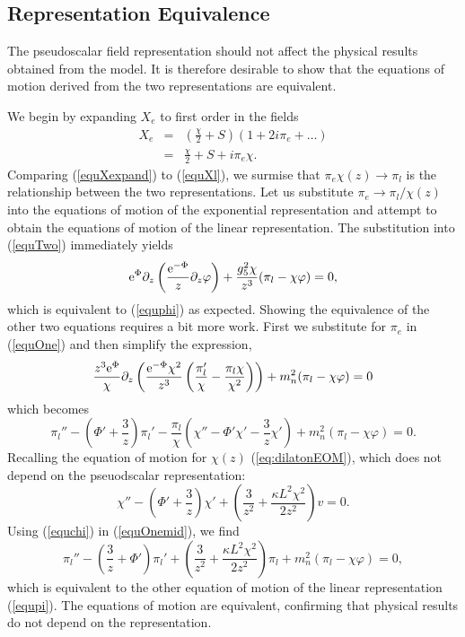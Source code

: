 \subsection{Representation Equivalence}

The pseudoscalar field representation should not affect the physical results obtained from the model. 
It is therefore desirable to show that the equations of motion derived from the two representations are equivalent.

We begin by expanding $X_{e}$ to first order in the fields 
\begin{eqnarray}
X_{e} & = & \left(\frac{\chi}{2}+S\right)(1+2i\pi_{e}+\ldots)\nonumber \\
 & = & \frac{\chi}{2}+S+i\pi_{e}\chi.\label{equXexpand}
\end{eqnarray}
Comparing (\ref{equXexpand}) to (\ref{equXl}), we surmise that $\pi_{e}\chi(z)\rightarrow\pi_{l}$ is the relationship between the two representations. 
Let us substitute
$\pi_{e}\rightarrow\pi_{l}/\chi(z)$ into the equations of motion of the exponential representation and attempt to obtain the equations of motion of the linear representation. 
The substitution into (\ref{equTwo}) immediately yields 
\begin{equation}
{\rm e}^{\Phi}\partial_{z}\left(\frac{{\rm e}^{-\Phi}}{z}\partial_{z}\varphi\right)+\frac{g_{5}^{2}\chi}{z^{3}}(\pi_{l}-\chi\varphi)=0,
\end{equation}
which is equivalent to (\ref{equphi}) as expected. 
Showing the equivalence of the other two equations requires a bit more work. 
First we substitute for $\pi_{e}$ in (\ref{equOne}) and then simplify the expression,
\begin{equation}
\frac{z^{3}{\rm e}^{\Phi}}{\chi}\partial_{z}\left(\frac{{\rm e}^{-\Phi}\chi^{2}}{z^{3}}\left(\frac{\pi_{l}'}{\chi}-\frac{\pi_{l}\chi}{\chi^{2}}\right)\right)+m_{n}^{2}(\pi_{l}-\chi\varphi)=0
\end{equation}
which becomes
\begin{equation}
\pi_{l}''-\left(\Phi'+\frac{3}{z}\right)\pi_{l}'-\frac{\pi_{l}}{\chi}\left(\chi''-\Phi'\chi'-\frac{3}{z}\chi'\right)+m_{n}^{2}(\pi_{l}-\chi\varphi)=0.\label{equOnemid}
\end{equation}
Recalling the equation of motion for $\chi(z)$ (\ref{eq:dilatonEOM}), which does not depend on the pseuodscalar representation: 
\begin{equation}
\chi''-\left(\Phi'+\frac{3}{z}\right)\chi'+\left(\frac{3}{z^{2}}+\frac{\kappa L^{2}\chi^{2}}{2z^{2}}\right)v=0.\label{equchi}
\end{equation}
Using (\ref{equchi}) in (\ref{equOnemid}), we find 
\begin{equation}
\pi_{l}''-\left(\frac{3}{z}+\Phi'\right)\pi_{l}'+\left(\frac{3}{z^{2}}+\frac{\kappa L^{2}\chi^{2}}{2z^{2}}\right)\pi_{l}+m_{n}^{2}\left(\pi_{l}-\chi\varphi\right)=0,
\end{equation}
which is equivalent to the other equation of motion of the linear representation (\ref{equpi}). 
The equations of motion are equivalent, confirming that physical results do not depend on the representation.

